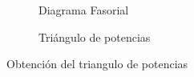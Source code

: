                \begin{figure}[H]
                  \centering
                     \begin{subfigure}[b]{0.4\textwidth}
                        \centering
                        \caption{Diagrama Fasorial}
                        \label{fig:DiagFasor}
                  \end{subfigure}
                  \hfill
                  \begin{subfigure}[b]{0.5\textwidth}
                        \centering
                        \caption{Triángulo de potencias}
                        \label{fig:TriangPot}
                  \end{subfigure}
                  \hfill
                  \caption{Obtención del triangulo de potencias}
                  \label{fig:ObtDeTriagDePot}
               \end{figure}
          
